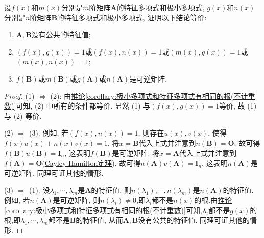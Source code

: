\documentclass[../../main.tex]{subfiles}
\begin{document}
\begin{proposition}\label{proposition:两个没有公共特征值的矩阵的极小多项式与特征多项式的关系}
设\(f(x)\)和\(m(x)\)分别是\(m\)阶矩阵\(\boldsymbol{A}\)的特征多项式和极小多项式, \(g(x)\)和\(n(x)\)分别是\(n\)阶矩阵\(\boldsymbol{B}\)的特征多项式和极小多项式, 证明以下结论等价:
\begin{enumerate}[(1)]
\item \(\boldsymbol{A},\boldsymbol{B}\)没有公共的特征值;

\item \((f(x),g(x)) = 1\)或\((f(x),n(x)) = 1\)或\((m(x),g(x)) = 1\)或\((m(x),n(x)) = 1\);

\item \(f(\boldsymbol{B})\)或\(m(\boldsymbol{B})\)或\(g(\boldsymbol{A})\)或\(n(\boldsymbol{A})\)是可逆矩阵.
\end{enumerate}
\end{proposition}
\begin{proof}
(1) \(\Leftrightarrow\) (2): 由\hyperref[corollary:极小多项式和特征多项式有相同的根(不计重数)]{推论\ref{corollary:极小多项式和特征多项式有相同的根(不计重数)}}可知, (2) 中所有的条件都等价. 显然 (1) 与\((f(x),g(x)) = 1\)等价, 故 (1) 与 (2) 等价.

(2) \(\Rightarrow\) (3): 例如, 若\((f(x),n(x)) = 1\), 则存在\(u(x),v(x)\), 使得\(f(x)u(x) + n(x)v(x) = 1\). 将\(x = \boldsymbol{B}\)代入上式并注意到\(n(\boldsymbol{B}) = \boldsymbol{O}\), 故可得\(f(\boldsymbol{B})u(\boldsymbol{B}) = \boldsymbol{I}_n\), 这表明\(f(\boldsymbol{B})\)是可逆矩阵. 将\(x = \boldsymbol{A}\)代入上式并注意到\(f(\boldsymbol{A}) = \boldsymbol{O}\)(\hyperref[theorem:Cayley-Hamilton定理]{Cayley-Hamilton定理}), 故可得\(n(\boldsymbol{A})v(\boldsymbol{A}) = \boldsymbol{I}_n\), 这表明\(n(\boldsymbol{A})\)是可逆矩阵. 同理可证其他的情形.

(3) \(\Rightarrow\) (1): 设\(\lambda_1,\cdots,\lambda_m\)是\(\boldsymbol{A}\)的特征值, 则\(n(\lambda_1),\cdots,n(\lambda_m)\)是\(n(\boldsymbol{A})\)的特征值. 例如, 若\(n(\boldsymbol{A})\)是可逆矩阵, 则\(n(\lambda_i)\neq 0\),即$\lambda_i$都不是$n(x)$的根.由\hyperref[corollary:极小多项式和特征多项式有相同的根(不计重数)]{推论\ref{corollary:极小多项式和特征多项式有相同的根(不计重数)}}可知,$\lambda_i$都不是$g(x)$的根,即\(\lambda_1,\cdots,\lambda_m\)都不是\(\boldsymbol{B}\)的特征值, 从而\(\boldsymbol{A},\boldsymbol{B}\)没有公共的特征值. 同理可证其他的情形.
\end{proof}
\end{document}
